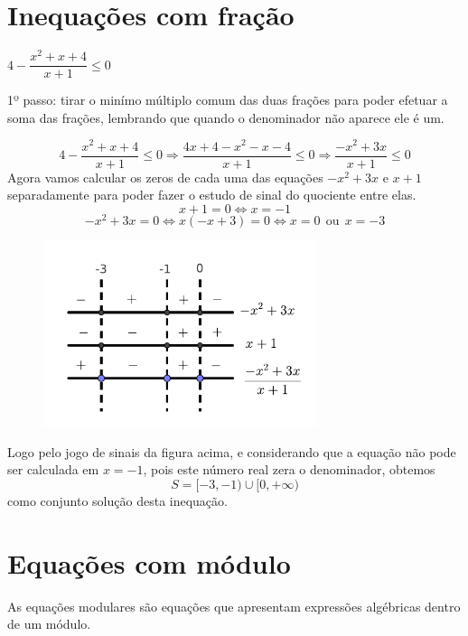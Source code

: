  \section{Inequações com fração}%

 \begin{exem}
  $4 - \dfrac{x^2+x+4}{x+1} \leq 0$
   \vskip0.3cm

  1º passo: tirar o minímo múltiplo comum das duas frações para poder efetuar a soma das frações, lembrando que quando o denominador não aparece ele é um.

  \[4 - \frac{x^2+x+4}{x+1} \leq 0 \Rightarrow
    \frac{4x+4-x^2-x-4}{x+1} \leq 0 \Rightarrow
    \frac{-x^2 + 3x}{x+1} \leq 0
  \]
  Agora vamos calcular os zeros de cada uma das equações $-x^2 + 3x$ e $x+1$ separadamente para poder fazer o estudo de sinal do quociente entre elas.
  \[x+1=0 \Leftrightarrow x= -1\]
  \[-x^2 + 3x= 0 \Leftrightarrow x(-x+3)=0 \Leftrightarrow x=0 \ \ \text{ou} \ \ x=-3\]
   \begin{figure}[H]
 \centering
 \includegraphics[width=8cm]{Capitulos/Figuras/sinais.pdf}
 \end{figure}

 Logo pelo jogo de sinais da figura acima, e considerando que a equação não pode ser calculada em $x= -1$, pois este número real zera o denominador, obtemos
 \[S= [-3, -1) \cup [0, +\infty)\]
 como conjunto solução desta inequação.

 \end{exem}


 \section{Equações com módulo}%

   \vskip0.3cm
 \colorbox{azul}{
 \begin{minipage}{0.9\linewidth}
 \begin{center}
  As equações modulares são equações que apresentam expressões algébricas dentro de um módulo.
 \end{center}
 \end{minipage}}
 \vskip0.3cm

